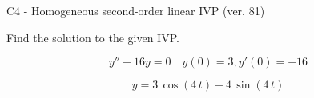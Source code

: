 \begin{exercise}
  \begin{exerciseTitle}C4 - Homogeneous second-order linear IVP (ver. 81)\end{exerciseTitle}
  \begin{exerciseStatement}
    
Find the solution to the given IVP.

    
\[y''+16y = 0 \hspace{1em} y(0) = 3 , y'(0) = -16\]

  \end{exerciseStatement}
  \begin{exerciseAnswer}
    
\[y= 3 \, \cos\left(4 \, t\right) - 4 \, \sin\left(4 \, t\right)\]

  \end{exerciseAnswer}
\end{exercise}